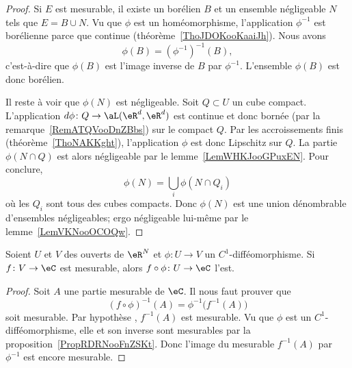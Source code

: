 												 \begin{proof}
												 Si \( E\) est mesurable, il existe un borélien \( B\) et un ensemble négligeable \( N\) tels que \( E=B\cup N\). Vu que \( \phi\) est un homéomorphisme, l'application \( \phi^{-1}\) est borélienne parce que continue (théorème~\ref{ThoJDOKooKaaiJh}). Nous avons
												 \begin{equation}
												 \phi(B)=(\phi^{-1})^{-1}(B),
												 \end{equation}
												 c'est-à-dire que \( \phi(B)\) est l'image inverse de \( B\) par \( \phi^{-1}\). L'ensemble \( \phi(B)\) est donc borélien.

												 Il reste à voir que \( \phi(N)\) est négligeable. Soit \( Q\subset U\) un cube compact. L'application \( d\phi\colon Q\to \aL(\eR^d,\eR^d)\) est continue et donc bornée (par la remarque~\ref{RemATQVooDnZBbs}) sur le compact \( Q\). Par les accroissements finis (théorème~\ref{ThoNAKKght}), l'application \( \phi\) est donc Lipschitz sur \( Q\). La partie \( \phi(N\cap Q)\) est alors négligeable par le lemme~\ref{LemWHKJooGPuxEN}. Pour conclure,
												 \begin{equation}
\phi(N)=\bigcup_i\phi(N\cap Q_i)
	\end{equation}
	où les \( Q_i\) sont tous des cubes compacts. Donc \( \phi(N)\) est une union dénombrable d'ensembles négligeables; ergo négligeable lui-même par le lemme~\ref{LemVKNooOCOQw}.
	\end{proof}

	\begin{proposition}
	Soient \( U\) et \( V\) des ouverts de \( \eR^N\) et \( \phi\colon U\to V\) un \( C^1\)-difféomorphisme. Si \( f\colon V\to \eC\) est mesurable, alors \(f\circ \phi\colon U\to \eC\) l'est.
	\end{proposition}

	\begin{proof}
	Soit \( A\) une partie mesurable de \( \eC\). Il nous faut prouver que
	\begin{equation}
(f\circ\phi)^{-1}(A)=\phi^{-1}\big( f^{-1}(A) \big)
	\end{equation}
	soit mesurable. Par hypothèse , \( f^{-1}(A)\) est mesurable. Vu que \( \phi\) est un \( C^1\)-difféomorphisme, elle et son inverse sont mesurables par la proposition~\ref{PropRDRNooFnZSKt}. Donc l'image du mesurable \( f^{-1}(A)\) par \( \phi^{-1}\) est encore mesurable.
	\end{proof}

